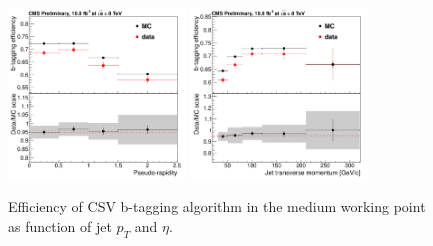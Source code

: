 \begin{figure}[!Hhtbp]
  \begin{center}
    \includegraphics[width=0.42\textwidth]{figs/LTdilep_csvMeffeta.png}
    \includegraphics[width=0.42\textwidth]{figs/LTdilep_csvMeffpt.png}
    \caption{Efficiency of CSV b-tagging algorithm in the medium working point as function of jet $p_{T}$ and $\eta$.}
    \label{fig:CSVEff}
  \end{center}
\end{figure}

%
%
%
%
%
